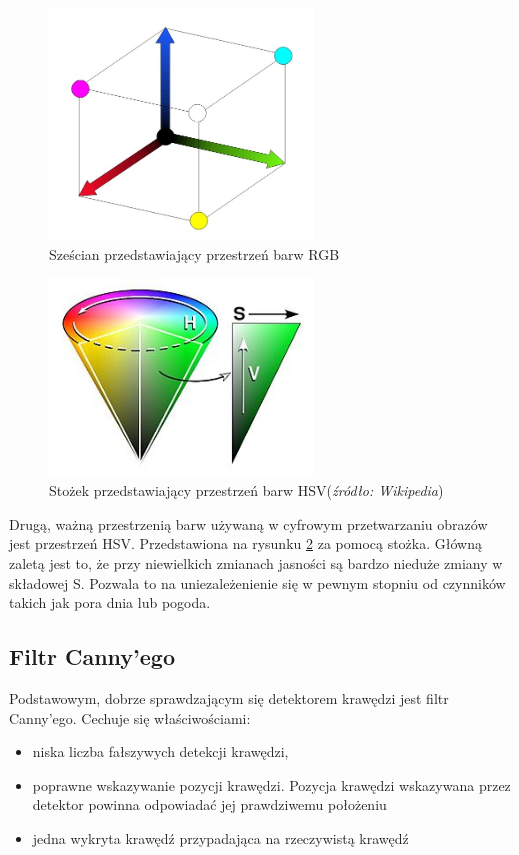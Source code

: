 \begin{figure}
  \centering
  \includegraphics[width=7cm]{img/rgb.jpg}
  \caption{Sześcian przedstawiający przestrzeń barw RGB\cite{W4}}
  \label{fig:rgb}
\end{figure}


\begin{figure}
  \centering
  \includegraphics[width=7cm]{img/hsv.jpg}
  \caption{Stożek przedstawiający przestrzeń barw HSV(\textit{źródło: Wikipedia})}
  \label{fig:hsv}
\end{figure}

Drugą, ważną przestrzenią barw używaną w cyfrowym przetwarzaniu obrazów jest przestrzeń HSV. Przedstawiona na rysunku \ref{fig:hsv} za pomocą stożka. Główną zaletą jest to, że przy niewielkich zmianach jasności są bardzo nieduże zmiany w składowej S. Pozwala to na uniezależenienie się w pewnym stopniu od czynników takich jak pora dnia lub pogoda.

\subsection{Filtr Canny'ego}
Podstawowym, dobrze sprawdzającym się detektorem krawędzi jest filtr Canny'ego. Cechuje się właściwościami:

\begin{itemize}
\item niska liczba fałszywych detekcji krawędzi,
\item poprawne wskazywanie pozycji krawędzi. Pozycja krawędzi wskazywana przez detektor powinna odpowiadać jej prawdziwemu położeniu
\item jedna wykryta krawędź przypadająca na rzeczywistą krawędź
\end{itemize}

